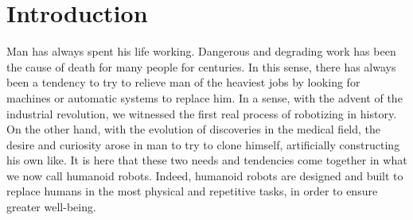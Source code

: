 \section{Introduction}Man has always spent his life working. Dangerous and degrading work has been the cause of death for many people for centuries. 
In this sense, there has always been a tendency to try to relieve man of the heaviest jobs by looking for machines or automatic systems to replace him.
In a sense, with the advent of the industrial revolution, we witnessed the first real process of robotizing in history.
On the other hand, with the evolution of discoveries in the medical field, the desire and curiosity arose in man to try to clone himself, artificially constructing his own like.
It is here that these two needs and tendencies come together in what we now call humanoid robots.
Indeed, humanoid robots are designed and built to replace humans in the most physical and repetitive tasks, in order to ensure greater well-being.

